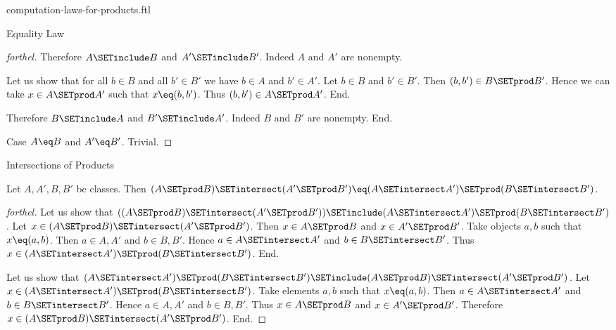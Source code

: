 \documentclass{naproche-library}
\begin{document}
\begin{smodule}[title=Computation Laws for Cartesian Products]{computation-laws-for-products.ftl}
\begin{sfragment}{Equality Law}
\begin{proof}[forthel]
      Therefore $A \SETinclude B$ and $A' \SETinclude B'$.
      Indeed $A$ and $A'$ are nonempty.

      Let us show that for all $b \in B$ and all $b' \in B'$ we have $b \in A$ and $b' \in A'$.
        Let $b \in B$ and $b' \in B'$.
        Then $(b, b') \in B \SETprod B'$.
        Hence we can take $x \in A \SETprod A'$ such that $x \eq (b, b')$.
        Thus $(b, b') \in A \SETprod A'$.
      End.

      Therefore $B \SETinclude A$ and $B' \SETinclude A'$.
      Indeed $B$ and $B'$ are nonempty.
    End.

    Case $A \eq B$ and $A' \eq B'$. Trivial.
  \end{proof}
\end{sfragment}

\begin{sfragment}{Intersections of Products}
  \begin{proposition}[forthel,id=FOUNDATIONS_05_4154592050806784]
    Let $A, A', B, B'$ be classes.
    Then $(A \SETprod B) \SETintersect (A' \SETprod B') \eq (A \SETintersect A') \SETprod (B \SETintersect B')$.
  \end{proposition}
  \begin{proof}[forthel]
    Let us show that $((A \SETprod B) \SETintersect (A' \SETprod B')) \SETinclude (A \SETintersect A') \SETprod (B \SETintersect B')$. %
      Let $x \in (A \SETprod B) \SETintersect (A' \SETprod B')$.
      Then $x \in A \SETprod B$ and $x \in A' \SETprod B'$.
      Take objects $a, b$ such that $x \eq (a, b)$.
      Then $a \in A, A'$ and $b \in B, B'$.
      Hence $a \in A \SETintersect A'$ and $b \in B \SETintersect B'$.
      Thus $x \in (A \SETintersect A') \SETprod (B \SETintersect B')$.
    End.

    Let us show that $(A \SETintersect A') \SETprod (B \SETintersect B') \SETinclude (A \SETprod B) \SETintersect (A' \SETprod B')$.
      Let $x \in (A \SETintersect A') \SETprod (B \SETintersect B')$.
      Take elements $a, b$ such that $x \eq (a, b)$.
      Then $a \in A \SETintersect A'$ and $b \in B \SETintersect B'$.
      Hence $a \in A, A'$ and $b \in B, B'$.
      Thus $x \in A \SETprod B$ and $x \in A' \SETprod B'$.
      Therefore $x \in (A \SETprod B) \SETintersect (A' \SETprod B')$.
    End.
  \end{proof}
\end{sfragment}


\end{smodule}
\end{document}
